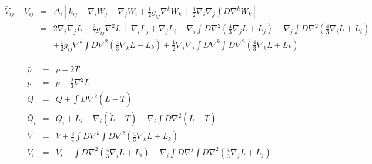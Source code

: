 \documentclass[10pt,letterpaper]{article}
\numberwithin{equation}{section}
\begin{document}
\begin{eqnarray}
\bar V_{ij}-V_{ij} &=&\Delta_\epsilon\left[ k_{ij} - \nabla_i W_j - \nabla_j W_i +\tfrac12 g_{ij} \nabla^k W_k
+\tfrac12 \nabla_i\nabla_j \int D \nabla^k W_k\right]
\nonumber\\
&=& 2\nabla_i \nabla_j L - \tfrac23 g_{ij}\nabla^2 L + \nabla_i L_j + \nabla_j L_i
-\nabla_i \int D\nabla^2 (\tfrac43 \nabla_j L + L_j)-\nabla_j \int D\nabla^2 (\tfrac43 \nabla_i L + L_i)
\nonumber\\
&&+\tfrac12 g_{ij} \nabla^k \int D\nabla^2 (\tfrac43 \nabla_k L + L_k) +\tfrac12 \nabla_i\nabla_j 
\int D \nabla^k \int D\nabla^2 (\tfrac43 \nabla_k L + L_k)
\end{eqnarray}

\begin{eqnarray}
\bar \rho &=& \rho - 2\dot T
\nonumber\\
\bar p &=& p +\frac23 \nabla^2 L
\nonumber\\
\bar Q &=& Q + \int D \nabla^2(\dot L-T)
\nonumber\\
\bar Q_i &=& Q_i +\dot L_i +  \nabla_i(\dot L -T)
-\nabla_i \int D \nabla^2(\dot L-T)
\nonumber\\
\bar V &=& V + \frac34 \int D \nabla^k \int D \nabla^2(\tfrac43 \nabla_k  L +  L_k )
\nonumber\\
\bar V_i &=& V_i + \int D\nabla^2 (\tfrac43 \nabla_i L + L_i) - \nabla_i \int D \nabla^j \int D\nabla^2 (\tfrac43 \nabla_j L + L_j)
\end{eqnarray}
\end{document}
